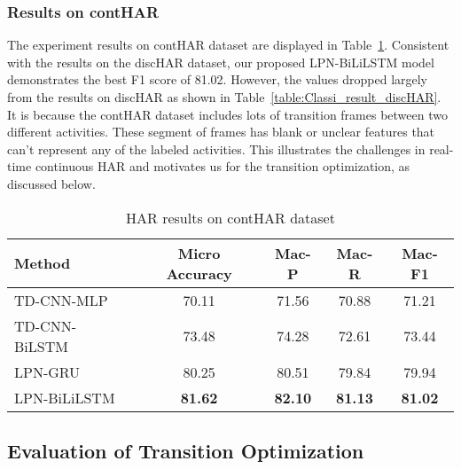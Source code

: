 \subsubsection{Results on contHAR}
The experiment results on contHAR dataset are displayed in Table~\ref{table:Classi_result_contHAR}. 
Consistent with the results on the discHAR dataset, our proposed LPN-BiLiLSTM model demonstrates the best F1 score of 81.02. 
However, the values dropped largely from the results on discHAR as shown in Table~\ref{table:Classi_result_discHAR}. 
It is because the contHAR dataset includes lots of transition frames between two different activities. These segment of frames has blank or unclear features that can't represent any of the labeled activities. This illustrates the challenges in real-time continuous HAR and motivates us for the transition optimization, as discussed below.

\begin{table}[h]
\caption{HAR results on contHAR dataset}
\label{table:Classi_result_contHAR}
\centering
{\begin{tabular}[l]{@{}lcccc}
\toprule
  Method &Micro Accuracy&Mac-P&Mac-R&Mac-F1\\
\midrule
  TD-CNN-MLP & 70.11 & 71.56 & 70.88 & 71.21 \\
  TD-CNN-BiLSTM & 73.48 & 74.28 & 72.61 & 73.44 \\
  \midrule
  LPN-GRU & 80.25 & 80.51 & 79.84 & 79.94 \\
  LPN-BiLiLSTM & \textbf{81.62} & \textbf{82.10} & \textbf{81.13} & \textbf{81.02} \\
\bottomrule
\end{tabular}}
\end{table}


\subsection{Evaluation of Transition Optimization}

